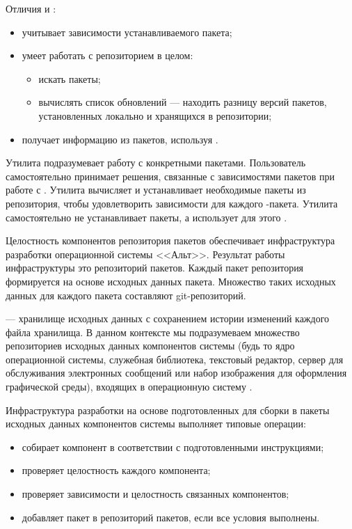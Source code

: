 Отличия  и :
\begin{itemize}
	\item {} учитывает зависимости устанавливаемого пакета;
	\item {} умеет работать с репозиторием в целом:
	\begin{itemize}
		\item искать пакеты;
		\item вычислять список обновлений --- находить разницу версий пакетов,
		установленных локально и хранящихся в репозитории;
	\end{itemize}
	\item {} получает информацию из пакетов, используя .
\end{itemize}

Утилита  подразумевает работу с конкретными пакетами. Пользователь самостоятельно
принимает решения, связанные с зависимостями пакетов  при работе с . Утилита 
вычисляет и устанавливает необходимые пакеты из репозитория, чтобы удовлетворить зависимости для
каждого -пакета. Утилита  самостоятельно не устанавливает пакеты, а использует для этого .


Целостность компонентов репозитория пакетов обеспечивает инфраструктура разработки операционной системы <<Альт>>.
Результат работы инфраструктуры это репозиторий пакетов. Каждый пакет репозитория формируется на
основе исходных данных пакета. Множество таких исходных данных для каждого пакета составляют git-репозиторий.

 --- хранилище исходных данных с сохранением истории изменений каждого файла
хранилища. В данном контексте мы подразумеваем множество репозиториев исходных данных компонентов
системы (будь то ядро операционной системы, служебная библиотека, текстовый редактор, сервер для обслуживания
электронных сообщений или набор изображения для оформления графической среды), входящих в операционную
систему .

Инфраструктура разработки  на основе подготовленных для сборки в пакеты исходных данных компонентов
системы выполняет типовые операции:
\begin{itemize}
	\item собирает компонент в соответствии с подготовленными инструкциями;
	\item проверяет целостность каждого компонента;
	\item проверяет зависимости и целостность связанных компонентов;
	\item добавляет пакет в репозиторий пакетов, если все условия выполнены.
\end{itemize}

